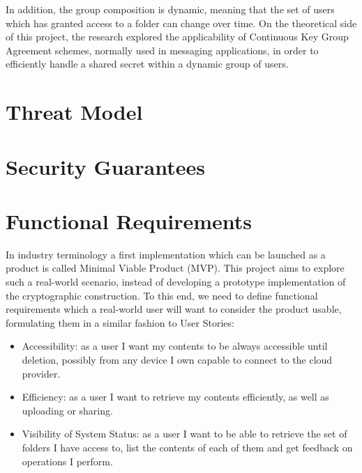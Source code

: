 In addition, the group composition is dynamic, meaning that the set of users which has granted access to a folder can change over time.
On the theoretical side of this project, the research explored the applicability of Continuous Key Group Agreement schemes,
normally used in messaging applications, in order to efficiently handle a shared secret within a dynamic group of users.

\section{Threat Model} \label{sc:threatmodel}


\section{Security Guarantees} \label{sc:securityguarantees}

\section{Functional Requirements} \label{sc:functionalrequirements}

In industry terminology a first implementation which can be launched as a product is called Minimal Viable Product (MVP).
This project aims to explore such a real-world scenario, instead of developing a prototype implementation of the cryptographic construction.
To this end, we need to define functional requirements which a real-world user will want to consider the product usable, formulating them in a similar fashion to User Stories:
\begin{itemize}
    \item Accessibility: as a user I want my contents to be always accessible until deletion, possibly from any device I own capable to connect to the cloud provider.
    \item Efficiency: as a user I want to retrieve my contents efficiently, as well as uploading or sharing.
    \item Visibility of System Status: as a user I want to be able to retrieve the set of folders I have access to, list the contents of each of them and get feedback on operations I perform.
\end{itemize}




